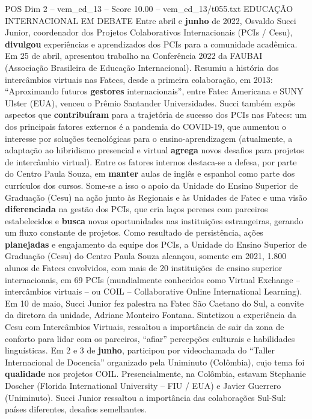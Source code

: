 \begin{textsample}{POS Dim 2 – vem\_ed\_13 – Score 10.00 – vem\_ed\_13/t055.txt}  \label{ex:f2_pos_072}
EDUCAÇÃO INTERNACIONAL EM DEBATE Entre abril e \textbf{junho} de 2022, Osvaldo Succi Junior, coordenador dos Projetos Colaborativos Internacionais (PCIs / Cesu), \textbf{divulgou} experiências e aprendizados dos PCIs para a comunidade acadêmica.
Em 25 de abril, apresentou trabalho na Conferência 2022 da FAUBAI (Associação Brasileira de Educação Internacional).
Resumiu a história dos intercâmbios virtuais nas Fatecs, desde a primeira colaboração, em 2013: “Aproximando futuros \textbf{gestores} internacionais”, entre Fatec Americana e SUNY Ulster (EUA), venceu o Prêmio Santander Universidades.
Succi também expôs aspectos que \textbf{contribuíram} para a trajetória de sucesso dos PCIs nas Fatecs: um dos principais fatores externos é a pandemia do COVID-19, que aumentou o interesse por soluções tecnológicas para o ensino-aprendizagem (atualmente, a adaptação ao hibridismo presencial e virtual \textbf{agrega} novos desafios para projetos de intercâmbio virtual).
Entre os fatores internos destaca-se a defesa, por parte do Centro Paula Souza, em \textbf{manter} aulas de inglês e espanhol como parte dos currículos dos cursos.
Some-se a isso o apoio da Unidade do Ensino Superior de Graduação (Cesu) na ação junto às Regionais e às Unidades de Fatec e uma visão \textbf{diferenciada} na gestão dos PCIs, que cria laços perenes com parceiros estabelecidos e \textbf{busca} novas oportunidades nas instituições estrangeiras, gerando um fluxo constante de projetos.
Como resultado de persistência, ações \textbf{planejadas} e engajamento da equipe dos PCIs, a Unidade do Ensino Superior de Graduação (Cesu) do Centro Paula Souza alcançou, somente em 2021, 1.800 alunos de Fatecs envolvidos, com mais de 20 instituições de ensino superior internacionais, em 69 PCIs (mundialmente conhecidos como Virtual Exchange – intercâmbios virtuais – ou COIL – Collaborative Online International Learning).
Em 10 de maio, Succi Junior fez palestra na Fatec São Caetano do Sul, a convite da diretora da unidade, Adriane Monteiro Fontana.
Sintetizou a experiência da Cesu com Intercâmbios Virtuais, ressaltou a importância de sair da zona de conforto para lidar com os parceiros, “afiar” percepções culturais e habilidades linguísticas.
Em 2 e 3 de \textbf{junho}, participou por videochamada do “Taller Internacional de Docencia” organizado pela Uniminuto (Colômbia), cujo tema foi \textbf{qualidade} nos projetos COIL.
Presencialmente, na Colômbia, estavam Stephanie Doscher (Florida International University – FIU / EUA) e Javier Guerrero (Uniminuto).
Succi Junior ressaltou a importância das colaborações Sul-Sul: países diferentes, desafios semelhantes.

\end{textsample}
